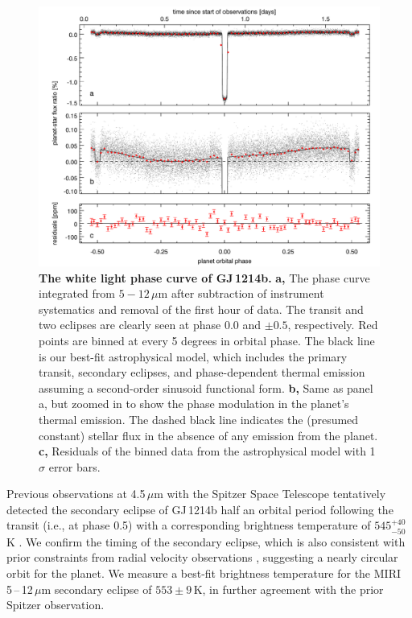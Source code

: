 \documentclass[pdflatex,sn-standardnature]{sn-jnl}%
\begin{document}
\begin{figure}[t]
    \centering
    \includegraphics[width=1.0\textwidth]{wl_phase_curve.pdf}
    \caption{\textbf{The white light phase curve of GJ\,1214b.} \textbf{a,} The phase curve integrated from $5-12$\,$\mu$m after subtraction of instrument systematics and removal of the first hour of data.  The transit and two eclipses are clearly seen at phase 0.0 and $\pm 0.5$, respectively.  Red points are binned at every 5 degrees in orbital phase.  The black line is our best-fit astrophysical model, which includes the primary transit, secondary eclipses, and phase-dependent thermal emission assuming a second-order sinusoid functional form.  \textbf{b,} Same as panel a, but zoomed in to show the phase modulation in the planet's thermal emission.  The dashed black line indicates the (presumed constant) stellar flux in the absence of any emission from the planet.  \textbf{c,} Residuals of the binned data from the astrophysical model with 1$\sigma$ error bars. }
    \label{fig:wl_phasecurve} 
\end{figure}

Previous observations at 4.5\,$\mu$m with the Spitzer Space Telescope tentatively detected the secondary eclipse of GJ\,1214b half an orbital period following the transit (i.e., at phase 0.5) with a corresponding brightness temperature of $545^{+40}_{-50}$\,K \cite{gillon14}. We confirm the timing of the secondary eclipse, which is also consistent with prior constraints from radial velocity observations \cite{cloutier21}, suggesting a nearly circular orbit for the planet.  We measure a best-fit brightness temperature for the MIRI 5\,--\,12\,$\mu$m secondary eclipse of $553 \pm 9$\,K, in further agreement with the prior Spitzer observation.
\end{document}
